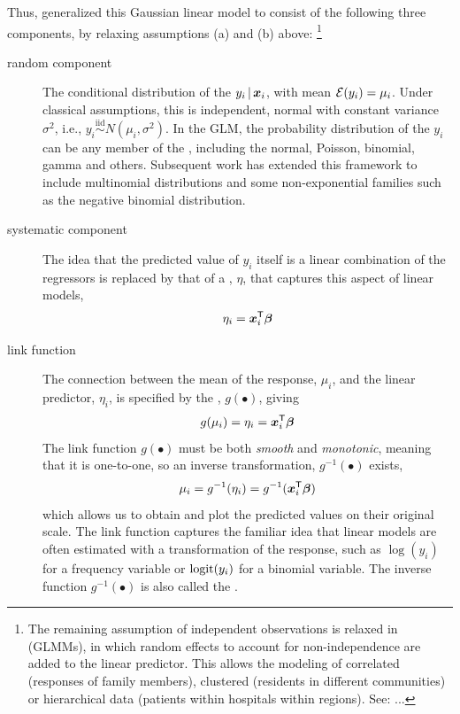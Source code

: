 \documentclass[11pt]{book}\usepackage[]{graphicx}\usepackage[]{color}
\begin{document}
Thus, \citet{NelderWedderburn:72} generalized this Gaussian linear model to
consist of the following three components, by relaxing assumptions (a) and (b) above:%
\footnote{The remaining assumption of independent observations is relaxed in
 (GLMMs), in which random effects to account for non-independence
are added to the linear predictor.
This allows the modeling of correlated (responses of family members), clustered (residents in
different communities)
or hierarchical data
(patients within hospitals within regions). See: \citet{McCullochNeuhaus:2005} ...
}

\begin{description}
  \item[random component] The conditional distribution of the $y_i \, | \, \bm{x}_i$,
  with mean $\mathcal{E} (y_i) = \mu_i$. Under classical assumptions,
  this is independent, normal with constant variance $\sigma^2$, i.e.,
  $ y_i \stackrel{\textrm{iid}}{\sim} N (\mu_i, \sigma^2)$.
  In the GLM, the probability distribution of the $y_i$ can be any member of the
  , including the normal, Poisson, binomial, gamma
  and others. Subsequent work has extended this framework to include
  multinomial distributions and some non-exponential families such as the
  negative binomial distribution.


  \item[systematic component] The idea that the predicted value of $y_i$ itself
  is a linear
  combination of the regressors is replaced by that of a ,
  $\eta$, that captures this aspect of linear models,
\begin{equation*}
\eta_i = \bm{x}_i^\mathsf{T} \bm{\beta}
\end{equation*}


  \item[link function] The connection between the mean of the response, $\mu_i$,
  and the linear predictor, $\eta_i$, is specified by the ,
  $g(\bullet)$, giving
\begin{equation*}
g(\mu_i) = \eta_i = \bm{x}_i^\mathsf{T} \bm{\beta}
\end{equation*}
  The link function $g(\bullet)$ must be both \emph{smooth} and \emph{monotonic}, meaning that
  it is one-to-one, so an inverse transformation, $g^{-1}(\bullet)$ exists,
\begin{equation*}
\mu_i = g^{-1}(\eta_i) = g^{-1}(\bm{x}_i^\mathsf{T} \bm{\beta})
\end{equation*}
  which allows us to obtain and plot the predicted values on their original scale.  The link function
  captures the familiar idea that linear models are often estimated with a transformation
  of the response, such as $\log(y_i)$ for a frequency variable or $\logit(y_i)$
  for a binomial variable.  The inverse function $g^{-1}(\bullet)$
  is also called the .
\end{description}
\end{document}
